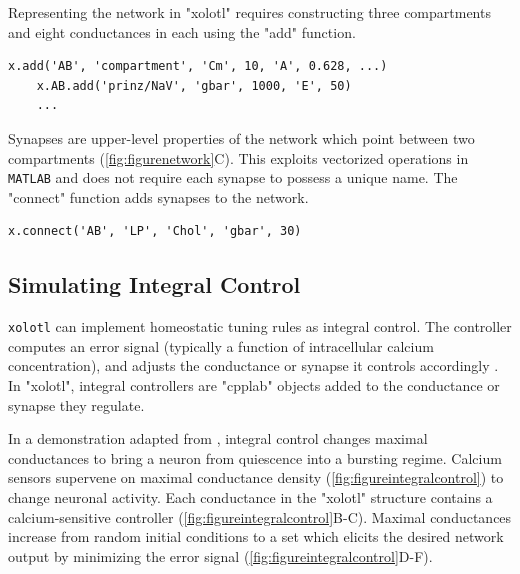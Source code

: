 \documentclass{frontiersSCNS} %
\begin{document}
Representing the network in "xolotl" requires constructing three compartments and eight conductances in each using the "add" function. 

\begin{lstlisting}[style=Matlab-editor]
	x.add('AB', 'compartment', 'Cm', 10, 'A', 0.628, ...)
	x.AB.add('prinz/NaV', 'gbar', 1000, 'E', 50)
	...
\end{lstlisting}

Synapses are upper-level properties of the network which point between two compartments (\ref{fig:figurenetwork}C). This exploits vectorized operations in \texttt{MATLAB} and does not require each synapse to possess a unique name. The "connect" function adds synapses to the network.

\begin{lstlisting}[style=Matlab-editor]
	x.connect('AB', 'LP', 'Chol', 'gbar', 30)
\end{lstlisting}

%
%
%
%
%
%

\subsection{Simulating Integral Control}

\texttt{xolotl} can implement homeostatic tuning rules as integral control. The controller computes an error signal (typically a function of intracellular calcium concentration), and adjusts the conductance or synapse it controls accordingly \autocite{olearyCorrelationsIonChannel2013}. In "xolotl", integral controllers are "cpplab" objects added to the conductance or synapse they regulate.

In a demonstration adapted from \cite{olearyCorrelationsIonChannel2013}, integral control changes maximal conductances to bring a neuron from quiescence into a bursting regime. Calcium sensors supervene on maximal conductance density (\ref{fig:figureintegralcontrol}) to change neuronal activity. Each conductance in the "xolotl" structure contains a calcium-sensitive controller (\ref{fig:figureintegralcontrol}B-C). Maximal conductances increase from random initial conditions to a set which elicits the desired network output by minimizing the error signal (\ref{fig:figureintegralcontrol}D-F).

%
%
%
%
%
%
\end{document}
